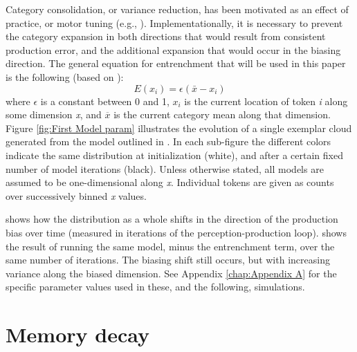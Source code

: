 Category consolidation, or variance reduction, has been motivated
as an effect of practice, or motor tuning (e.g., \citealp{saltzman1989dynamical}).
Implementationally, it is necessary to prevent the category expansion
in both directions that would result from consistent production error,
and the additional expansion that would occur in the biasing direction.
The general equation for entrenchment that will be used in this paper
is the following (based on \citet{Pierrehumbert2000}):
\begin{equation}
E(x_{i})=\epsilon(\bar{x}-x_{i})\label{eq:Entrenchment}
\end{equation}
where $\epsilon$ is a constant between 0 and 1, $x_{i}$ is the current
location of token \emph{i} along some dimension \emph{x}, and $\overline{x}$
is the current category mean along that dimension. Figure \ref{fig:First Model param}
illustrates the evolution of a single exemplar cloud generated from
the model outlined in . In
each sub-figure the different colors indicate the same distribution
at initialization (white), and after a certain fixed number of model
iterations (black). Unless otherwise stated, all models are assumed
to be one-dimensional along \emph{x}. Individual tokens are given
as counts over successively binned \emph{x} values. 

 shows how the distribution as
a whole shifts in the direction of the production bias over time (measured
in iterations of the perception-production loop). 
shows the result of running the same model, minus the entrenchment
term, over the same number of iterations. The biasing shift still
occurs, but with increasing variance along the biased dimension. See
Appendix \ref{chap:Appendix A} for the specific parameter values
used in these, and the following, simulations. 

\section{Memory decay}

